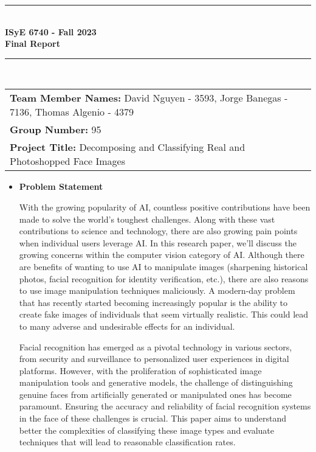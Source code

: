 \documentclass{article}
\begin{document}
\begin{titlepage}
	\clearpage\thispagestyle{empty}
	\centering
	\vspace{1cm}

	\rule{\linewidth}{1mm} \\[0.5cm]
	{ \Large \bfseries ISyE 6740 - Fall 2023\\[0.2cm]
		Final Report}\\[0.5cm]
	\rule{\linewidth}{1mm} \\[1cm]

		\begin{tabular}{l p{5cm}}
		\textbf{Team Member Names:} David Nguyen - 3593, Jorge Banegas - 7136, Thomas Algenio - 4379&  \\[10pt]
  		\textbf{Group Number:} 95 &  \\[10pt]
		\textbf{Project Title:} Decomposing and Classifying Real and Photoshopped Face Images &  \\[10pt]
		\end{tabular}

        \begin{itemize}
            \item[] \textbf{Problem Statement}

            With the growing popularity of AI, countless positive contributions have been made to solve the world's toughest challenges. Along with these vast contributions to science and technology, there are also growing pain points when individual users leverage AI. In this research paper, we'll discuss the growing concerns within the computer vision category of AI. Although there are benefits of wanting to use AI to manipulate images (sharpening historical photos, facial recognition for identity verification, etc.), there are also reasons to use image manipulation techniques maliciously. A modern-day problem that has recently started becoming increasingly popular is the ability to create fake images of individuals that seem virtually realistic. This could lead to many adverse and undesirable effects for an individual.

            Facial recognition has emerged as a pivotal technology in various sectors, from security and surveillance to personalized user experiences in digital platforms. However, with the proliferation of sophisticated image manipulation tools and generative models, the challenge of distinguishing genuine faces from artificially generated or manipulated ones has become paramount. Ensuring the accuracy and reliability of facial recognition systems in the face of these challenges is crucial. This paper aims to understand better the complexities of classifying these image types and evaluate techniques that will lead to reasonable classification rates.


\end{itemize}
\end{titlepage}
\end{document}
